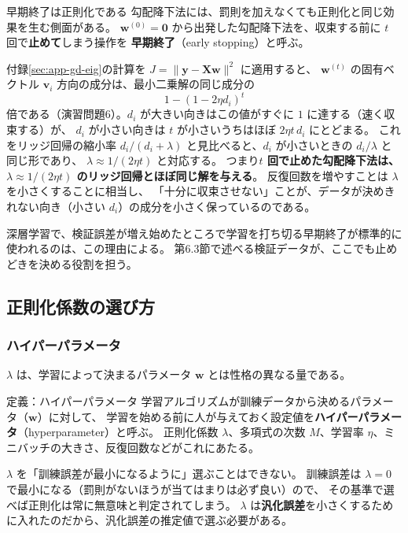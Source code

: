 \begin{mlcolumn}{早期終了は正則化である}
勾配降下法には、罰則を加えなくても正則化と同じ効果を生む側面がある。
$\bm{w}^{(0)} = \bm{0}$ から出発した勾配降下法を、収束する前に $t$ 回で\textbf{止めて}しまう操作を
\textbf{早期終了}（early stopping）と呼ぶ。

付録\ref{sec:app-gd-eig}の計算を $J = \|\bm{y} - \bm{X}\bm{w}\|^2$ に適用すると、
$\bm{w}^{(t)}$ の固有ベクトル $\bm{v}_i$ 方向の成分は、最小二乗解の同じ成分の
\begin{equation*}
  1 - (1 - 2\eta d_i)^t
\end{equation*}
倍である（演習問題6）。$d_i$ が大きい向きはこの値がすぐに $1$ に達する（速く収束する）が、
$d_i$ が小さい向きは $t$ が小さいうちはほぼ $2\eta t\,d_i$ にとどまる。
これをリッジ回帰の縮小率 $d_i/(d_i + \lambda)$ と見比べると、$d_i$ が小さいときの $d_i/\lambda$ と同じ形であり、
$\lambda \approx 1/(2\eta t)$ と対応する。
つまり\textbf{$t$ 回で止めた勾配降下法は、$\lambda \approx 1/(2\eta t)$ のリッジ回帰とほぼ同じ解を与える}。
反復回数を増やすことは $\lambda$ を小さくすることに相当し、
「十分に収束させない」ことが、データが決めきれない向き（小さい $d_i$）の成分を小さく保っているのである。

深層学習で、検証誤差が増え始めたところで学習を打ち切る早期終了が標準的に使われるのは、この理由による。
第6.3節で述べる検証データが、ここでも止めどきを決める役割を担う。
\end{mlcolumn}


\subsection{正則化係数の選び方}

\subsubsection{ハイパーパラメータ}

$\lambda$ は、学習によって決まるパラメータ $\bm{w}$ とは性格の異なる量である。

\begin{itembox}[l]{定義：ハイパーパラメータ}
学習アルゴリズムが訓練データから決めるパラメータ（$\bm{w}$）に対して、
学習を始める前に人が与えておく設定値を\textbf{ハイパーパラメータ}（hyperparameter）と呼ぶ。
正則化係数 $\lambda$、多項式の次数 $M$、学習率 $\eta$、ミニバッチの大きさ、反復回数などがこれにあたる。
\end{itembox}

$\lambda$ を「訓練誤差が最小になるように」選ぶことはできない。
訓練誤差は $\lambda = 0$ で最小になる（罰則がないほうが当てはまりは必ず良い）ので、
その基準で選べば正則化は常に無意味と判定されてしまう。
$\lambda$ は\textbf{汎化誤差}を小さくするために入れたのだから、汎化誤差の推定値で選ぶ必要がある。

